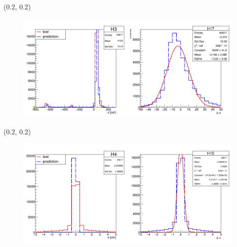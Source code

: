 \documentclass[12pt, xcolor={dvipsnames}, aspectratio = 169]{beamer}
\begin{document}
\begin{frame}

\begin{textblock}{14.0}(0.2, 0.2)
    \begin{figure}
        \centering
        \includegraphics[width=14.0cm]{../imgs/vtz.png}
    \end{figure}
\end{textblock}

\end{frame}

\begin{frame}

\begin{textblock}{14.0}(0.2, 0.2)
    \begin{figure}
        \centering
        \includegraphics[width=14.0cm]{../imgs/vtx.png}
    \end{figure}
\end{textblock}

\end{frame}
\end{document}
